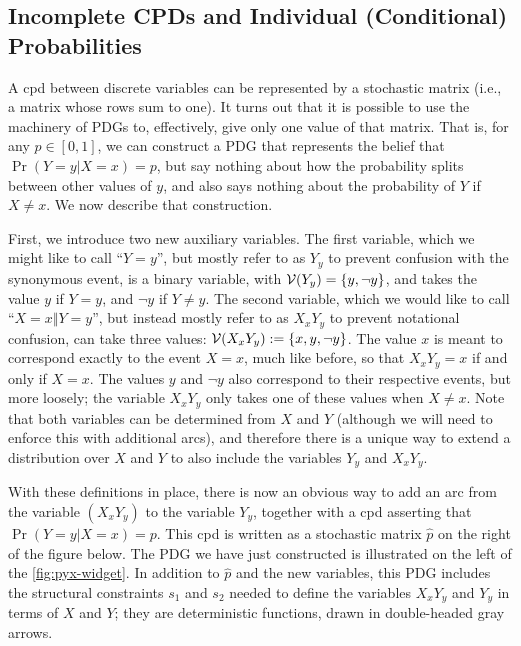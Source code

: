 \subsection{Incomplete CPDs and Individual (Conditional) Probabilities}
    \label{sec:prob-widget}
    
A cpd between discrete variables can be represented by
    a stochastic matrix (i.e., a matrix whose rows sum to one).
It turns out that it is possible to use the machinery of PDGs
    to, effectively, give only one value of that matrix.
That is, for any $p \in [0,1]$, we can construct a PDG
    that represents the belief that $\Pr(Y{=}y|X={x}) = p$, but say nothing about
    how the probability splits between other values of $y$, and also says nothing
    about the probability of $Y$ if $X \ne x$.
We now describe that construction.

\def\XxYy{{X{=}x\Vert Y{=}y}}
\def\XxYyshort{{X_x Y_y}}
\def\Yy{{Y{=}y}}
\def\Yyshort{{Y_y}}

First, we introduce two new auxiliary variables.
The first variable, which we might like to call ``$\Yy$'', but
    mostly refer to as $\Yyshort$ to prevent confusion with the synonymous
    event, is a binary variable, with $\V(\Yyshort) = \{y, \lnot y\}$,
    and takes the value $y$ if $Y=y$, and $\lnot y$ if $Y \ne y$.
The second variable, which we would like to call ``$\XxYy$'',
    but instead mostly refer to as $\XxYyshort$ to prevent notational confusion,
    can take three values: $\V(\XxYyshort):= \{ x, y, \lnot y \}$.
The value $x$ is meant to correspond exactly to the event $X{=}x$,
    much like before, so that $\XxYyshort = x$ if and only if $X = x$.
The values $y$ and $\lnot y$ also correspond to their respective
    events, but more loosely; the variable $\XxYyshort$ only takes one of these
    values when $X \ne x$.
Note that both variables can be determined from $X$ and $Y$
(although we will need to enforce this with additional arcs), and
therefore there is a unique way to extend a
distribution over $X$ and $Y$ to also include the variables $\Yyshort$ and $\XxYyshort$.

With these definitions in place, there is
    now an obvious way to add an arc from the variable $(\XxYyshort)$
    to the variable $\Yyshort$, together with a cpd asserting that $\Pr(Y{=}y|X{=}x)=p$.
This cpd is written as a stochastic matrix $\hat p$ on the right of the figure below.
The PDG we have just constructed is illustrated on the left of the \cref{fig:pyx-widget}.
In addition to $\hat p$ and the new variables, this PDG
    includes the structural constraints $s_1$ and $s_2$ needed to define the variables
    $\XxYyshort$ and $\Yyshort$ in terms of $X$ and $Y$; they are deterministic functions,
    drawn in double-headed gray arrows.


